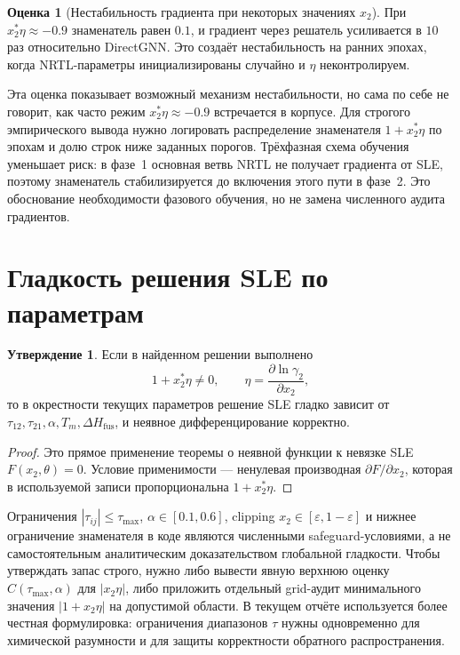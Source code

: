 \documentclass[11pt]{article}
\newcommand{\dHfus}{\Delta H_{\mathrm{fus}}}
\theoremstyle{definition}
\newtheorem{estimate}{Оценка}[section]
\newtheorem{claim}{Утверждение}[section]
\begin{document}
\begin{estimate}[Нестабильность градиента при некоторых значениях $x_2$]
При $x_2^* \eta \approx -0.9$ знаменатель равен $0.1$, и градиент через решатель усиливается в $10$ раз относительно DirectGNN. Это создаёт нестабильность на ранних эпохах, когда NRTL-параметры инициализированы случайно и $\eta$ неконтролируем.
\end{estimate}

Эта оценка показывает возможный механизм нестабильности, но сама по себе не говорит, как часто режим $x_2^*\eta\approx-0.9$ встречается в корпусе. Для строгого эмпирического вывода нужно логировать распределение знаменателя $1+x_2^*\eta$ по эпохам и долю строк ниже заданных порогов. Трёхфазная схема обучения уменьшает риск: в фазе~1 основная ветвь NRTL не получает градиента от SLE, поэтому знаменатель стабилизируется до включения этого пути в фазе~2. Это обоснование необходимости фазового обучения, но не замена численного аудита градиентов.

\section{Гладкость решения SLE по параметрам}
\label{app:smoothness-implicit}

\begin{claim}
Если в найденном решении выполнено
\begin{equation*}
    1+x_2^*\eta \ne 0,
    \qquad
    \eta=\frac{\partial \ln\gamma_2}{\partial x_2},
\end{equation*}
то в окрестности текущих параметров решение SLE гладко зависит от $\tau_{12},\tau_{21},\alpha,T_m,\dHfus$, и неявное дифференцирование корректно.
\end{claim}

\begin{proof}
Это прямое применение теоремы о неявной функции к невязке SLE $F(x_2,\theta)=0$. Условие применимости --- ненулевая производная $\partial F/\partial x_2$, которая в используемой записи пропорциональна $1+x_2^*\eta$.
\end{proof}

Ограничения $|\tau_{ij}|\le\tau_{\max}$, $\alpha\in[0.1,0.6]$, clipping $x_2\in[\varepsilon,1-\varepsilon]$ и нижнее ограничение знаменателя в коде являются численными safeguard-условиями, а не самостоятельным аналитическим доказательством глобальной гладкости. Чтобы утверждать запас строго, нужно либо вывести явную верхнюю оценку $C(\tau_{\max},\alpha)$ для $|x_2\eta|$, либо приложить отдельный grid-аудит минимального значения $|1+x_2\eta|$ на допустимой области. В текущем отчёте используется более честная формулировка: ограничения диапазонов $\tau$ нужны одновременно для химической разумности и для защиты корректности обратного распространения.
\end{document}
